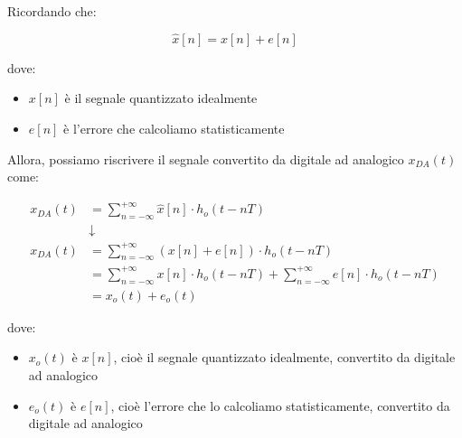 Ricordando che: 

{
    \Large 
    \begin{equation}
        \hat{x} \left[ n\right] = x \left[n\right] + e \left[ n\right]
    \end{equation}
}

dove: 

\begin{itemize}
    \item $x \left[n \right]$ è il segnale quantizzato idealmente 
    \item $e \left[ n\right]$ è l'errore che calcoliamo statisticamente
\end{itemize}

\newpage 

Allora, possiamo riscrivere il segnale convertito da digitale ad analogico $x_{DA} \left(t\right)$ come: 

{
    \Large 
    \begin{equation}
        \begin{split}
            x_{DA} \left(t\right)
            &= 
            \sum_{n = -\infty}^{+ \infty}
            \hat{x} \left[ n\right] \cdot h_o \left(t - nT\right) 
            \\
            &\downarrow
            \\
            x_{DA} \left(t\right)
            &= 
            \sum_{n = -\infty}^{+ \infty}
            \left( x \left[n\right] + e \left[ n\right]\right) \cdot h_o \left(t - nT\right) 
            \\
            &= 
            \sum_{n = -\infty}^{+ \infty}
            x \left[n\right] \cdot h_o \left(t - nT\right)
            + 
            \sum_{n = -\infty}^{+ \infty}
            e \left[ n\right] \cdot h_o \left(t - nT\right)  
            \\
            &= 
            x_o \left(t\right) + e_o \left(t\right)         
        \end{split}
    \end{equation}
}

dove: 

\begin{itemize}
    \item $x_o \left(t\right)$ è $x \left[n \right]$, cioè il segnale quantizzato idealmente, convertito da digitale ad analogico   
    \item $e_o \left(t\right)$ è $e \left[ n\right]$, cioè l'errore che lo calcoliamo statisticamente, convertito da digitale ad analogico
\end{itemize}

